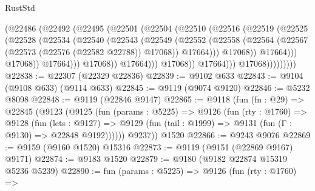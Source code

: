 \begin{lexlean}{RustStd}
\begin{coremodule}
                                  (@22486
                                    (@22492
                                      (@22495
                                        (@22501
                                          (@22504
                                            (@22510
                                              (@22516
                                                (@22519
                                                  (@22525
                                                    (@22528
                                                      (@22534
                                                        (@22540
                                                          (@22543
                                                            (@22549
                                                              (@22552
                                                                (@22558
                                                                  (@22564
                                                                    (@22567
                                                                      (@22573
                                                                        (@22576 (@22582 @22788))
                                                                        @17068))
                                                                    @17664)))
                                                              @17068))
                                                          @17664)))
                                                    @17068))
                                                @17664)))
                                          @17068))
                                      @17664)))
                                @17068))
                            @17664)))
                      @17068)))))))))
@22838 := @22307 (@22329 @22836)
@22839 := @9102 @633
@22843 := @9104 (@9108 @633) (@9114 @633)
@22845 := @9119 (@9074 @9120)
@22846 := @5232 @8098
@22848 := @9119 (@22846 @9147)
@22865 := @9118
    (fun (fn : @29) =>
    @22845
      (@9123
        (@9125
          (fun (params : @5225) =>
          @9126
            (fun (rty : @1760) =>
            @9128
              (fun (lets : @9127) =>
              @9129 (fun (tail : @1999) => @9131 (fun (Γ : @9130) => @22848 @9192))))))
        @9237))
    @1520
@22866 := @9243 @9076
@22869 := @9159 (@9160 @1520) @15316
@22873 := @9119 (@9151 (@22869 @9167) @9171)
@22874 := @9183 @1520
@22879 := @9180 (@9182 @22874 @15319 @5236 @5239)
@22890 := fun (params : @5225) =>
  @9126
    (fun (rty : @1760) =>

\end{coremodule}
\end{lexlean}

